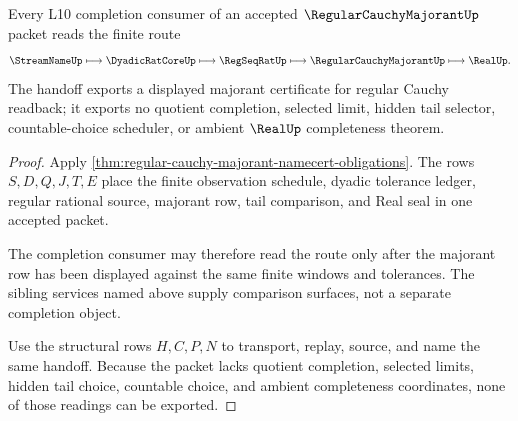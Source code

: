 \begin{theorem}
\label{thm:regular-cauchy-majorant-completion-handoff}
Every L10 completion consumer of an accepted $\RegularCauchyMajorantUp$ packet reads the finite route
$$
\StreamNameUp \longmapsto \DyadicRatCoreUp \longmapsto \RegSeqRatUp \longmapsto \RegularCauchyMajorantUp \longmapsto \RealUp .
$$
The handoff exports a displayed majorant certificate for regular Cauchy readback; it exports no quotient completion, selected limit, hidden tail selector, countable-choice scheduler, or ambient $\RealUp$ completeness theorem.
\end{theorem}
\begin{proof}
Apply \autoref{thm:regular-cauchy-majorant-namecert-obligations}. The rows $S,D,Q,J,T,E$ place the finite observation schedule, dyadic tolerance ledger, regular rational source, majorant row, tail comparison, and Real seal in one accepted packet.

The completion consumer may therefore read the route only after the majorant row has been displayed against the same finite windows and tolerances. The sibling services named above supply comparison surfaces, not a separate completion object.

Use the structural rows $H,C,P,N$ to transport, replay, source, and name the same handoff. Because the packet lacks quotient completion, selected limits, hidden tail choice, countable choice, and ambient completeness coordinates, none of those readings can be exported.
\end{proof}


\begin{closurestatus}{\RegularCauchyMajorantUp}
  \theoryclosure{\seedClosure}
  \formalstatus{\unformalizedV}
\end{closurestatus}
